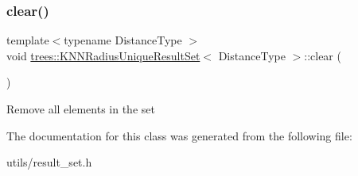 \subsubsection{\texorpdfstring{clear()}{clear()}}
{\footnotesize\ttfamily template$<$typename Distance\+Type $>$ \\
void \hyperlink{classtrees_1_1_k_n_n_radius_unique_result_set}{trees\+::\+K\+N\+N\+Radius\+Unique\+Result\+Set}$<$ Distance\+Type $>$\+::clear (\begin{DoxyParamCaption}{ }\end{DoxyParamCaption})\hspace{0.3cm}{\ttfamily [inline]}}

Remove all elements in the set 

The documentation for this class was generated from the following file\+:\begin{DoxyCompactItemize}
\item 
utils/result\+\_\+set.\+h\end{DoxyCompactItemize}
